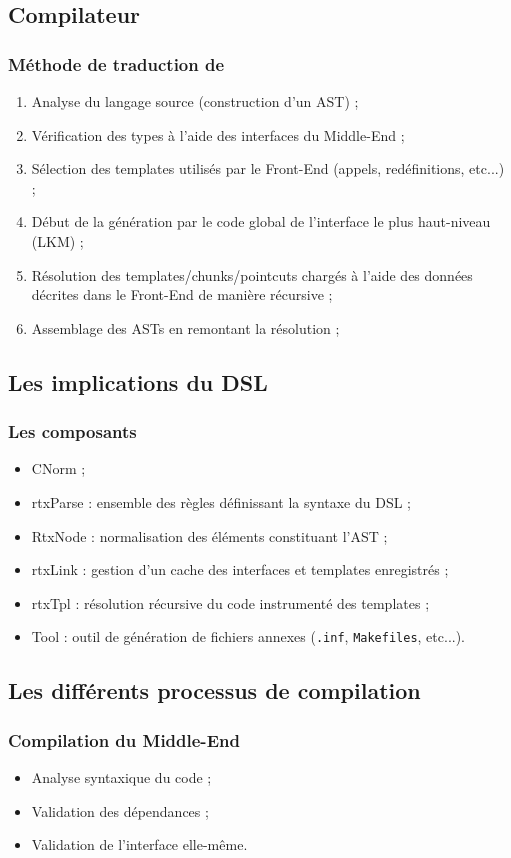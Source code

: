 \documentclass[]{beamer}
\begin{document}
\subsection{Compilateur \rtx}
\begin{frame}
\frametitle{Méthode de traduction de \rtx}
\begin{enumerate}[<+->]
    \item Analyse du langage source (construction d'un AST) ;
    \item Vérification des types à l'aide des interfaces du Middle-End ;
    \item Sélection des templates utilisés par le Front-End (appels,
            redéfinitions, etc...) ;
    \item Début de la génération par le code global de l'interface le
            plus haut-niveau (LKM) ;
    \item Résolution des templates/chunks/pointcuts chargés à l'aide des
            données décrites dans le Front-End de manière récursive ;
    \item Assemblage des ASTs en remontant la résolution ;
\end{enumerate}
\end{frame}



\subsection{Les implications du DSL}
\begin{frame}
\frametitle{Les composants}
\begin{itemize}[<+->]
    \item CNorm ;
    \item rtxParse : ensemble des règles définissant la syntaxe du DSL ;
    \item RtxNode : normalisation des éléments constituant l'AST ;
    \item rtxLink : gestion d'un cache des interfaces et templates enregistrés ;
    \item rtxTpl : résolution récursive du code instrumenté des templates ;
    \item Tool : outil de génération de fichiers annexes (\texttt{.inf},
                 \texttt{Makefiles}, etc...).
\end{itemize}
\end{frame}


\subsection{Les différents processus de compilation}
\begin{frame}
\frametitle{Compilation du Middle-End}
\begin{itemize}[<+->]
    \item Analyse syntaxique du code ;
    \item Validation des dépendances ;
    \item Validation de l'interface elle-même.
\end{itemize}
\end{frame}
\end{document}

